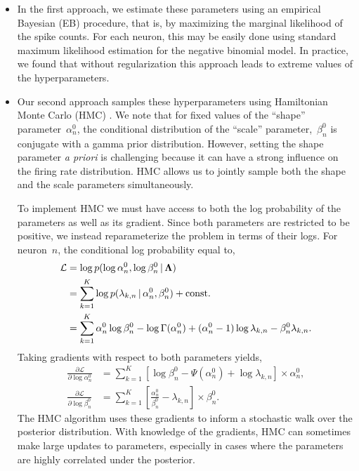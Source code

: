 \begin{itemize}

\item In the first approach, we estimate these parameters using an
  empirical Bayesian (EB) procedure, that is, by maximizing the
  marginal likelihood of the spike counts.  For each neuron, this may be
  easily done using standard maximum likelihood estimation for the
  negative binomial model.  In practice, we found that without
  regularization this approach leads to extreme values of the
  hyperparameters.

 

\item Our second approach samples these hyperparameters using
  Hamiltonian Monte Carlo (HMC) \citep{Neal10}. We note that for fixed
  values of the ``shape'' parameter~$\alpha_n^0$, the conditional
  distribution of the ``scale'' parameter,~$\beta_n^0$ is conjugate
  with a gamma prior distribution. However, setting the shape
  parameter \textit{a priori} is challenging because it can have a
  strong influence on the firing rate distribution. HMC allows us to
  jointly sample both the shape and the scale parameters
  simultaneously.

To implement HMC we must have access to both the log probability of
the parameters as well as its gradient. Since both parameters are
restricted to be positive, we instead reparameterize the problem in
terms of their logs. For neuron~$n$, the conditional log probability
equal to,
\begin{align*}
\mathcal{L} 
  &= \log p(\log \alpha_n^0, \log \beta_n^0 \,|\, \boldsymbol{\Lambda}) \\
  &= \sum_{k=1}^K \log p(\lambda_{k,n} \,|\, \alpha_n^0, \beta_n^0) + \text{const.} \\
  &= \sum_{k=1}^K \alpha_n^0 \log \beta_n^0 - \log \Gamma(\alpha_n^0) + (\alpha_n^0 - 1) \log \lambda_{k,n} - \beta_n^0 \lambda_{k,n}.
\end{align*}
Taking gradients with respect to both parameters yields,
\begin{align*}
  \frac{\partial \mathcal{L}}{\partial \log \alpha_n^0} 
  &= \sum_{k=1}^K \left[ \log \beta_n^0 -\Psi(\alpha_n^0) + \log \lambda_{k,n} \right] \times \alpha_n^0, \\
  \frac{\partial \mathcal{L}}{\partial \log \beta_n^0} 
  &= \sum_{k=1}^K \left[ \frac{\alpha_n^0}{\beta_n^0}  - \lambda_{k,n} \right] \times \beta_n^0.
\end{align*}
The HMC algorithm uses these gradients to inform a stochastic walk
over the posterior distribution. With knowledge of the gradients, HMC
can sometimes make large updates to parameters, especially in cases
where the parameters are highly correlated under the posterior.



\end{itemize}

